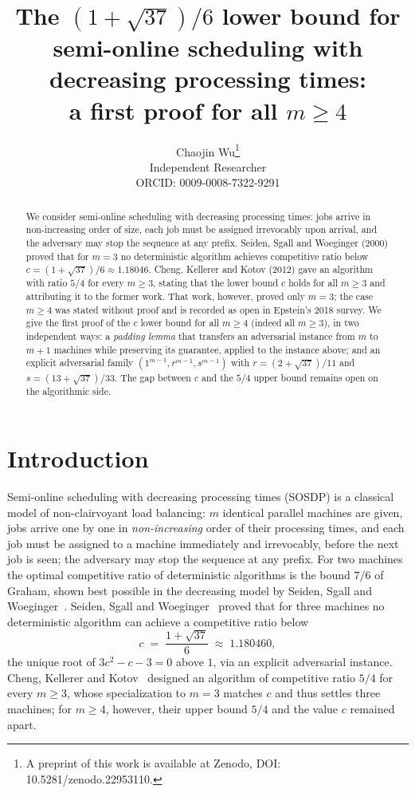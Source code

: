 \documentclass[11pt]{article}
\title{The $(1+\sqrt{37})/6$ lower bound for semi-online scheduling with
decreasing processing times:\\ a first proof for all $m\ge 4$}
\author{Chaojin Wu\thanks{A preprint of this work is available at Zenodo, DOI: 10.5281/zenodo.22953110.}\\
Independent Researcher\\
ORCID: 0009-0008-7322-9291}
\date{}
\theoremstyle{definition}
\begin{document}
\maketitle

\begin{abstract}
We consider semi-online scheduling with decreasing processing times: jobs
arrive in non-increasing order of size, each job must be assigned irrevocably
upon arrival, and the adversary may stop the sequence at any prefix. Seiden,
Sgall and Woeginger (2000) proved that for $m=3$ no deterministic algorithm
achieves competitive ratio below $c=(1+\sqrt{37})/6\approx 1.18046$. Cheng,
Kellerer and Kotov (2012) gave an algorithm with ratio $5/4$ for every
$m\ge 3$, stating that the lower bound $c$ holds for all $m\ge 3$ and
attributing it to the former work. That work, however, proved only $m=3$;
the case $m\ge 4$ was stated without proof and is recorded as open in
Epstein's 2018 survey.
We give the first proof of the $c$ lower bound for all $m\ge 4$ (indeed all
$m\ge 3$), in two independent ways: a \emph{padding lemma} that transfers an
adversarial instance from $m$ to $m+1$ machines while preserving its
guarantee, applied to the instance above; and an explicit adversarial family
$(1^{m-1},r^{m-1},s^{m-1})$ with $r=(2+\sqrt{37})/11$ and
$s=(13+\sqrt{37})/33$. The gap between $c$ and the $5/4$ upper bound remains
open on the algorithmic side.
\end{abstract}

\section{Introduction}

Semi-online scheduling with decreasing processing times (SOSDP) is a
classical model of non-clairvoyant load balancing: $m$ identical parallel
machines are given, jobs arrive one by one in \emph{non-increasing} order of
their processing times, and each job must be assigned to a machine
immediately and irrevocably, before the next job is seen; the adversary may
stop the sequence at any prefix. For two machines the optimal competitive
ratio of deterministic algorithms is the bound $7/6$ of Graham, shown best
possible in the decreasing model by Seiden, Sgall and
Woeginger~\cite{SSW00}. Seiden, Sgall and Woeginger~\cite{SSW00} proved
that for three machines no deterministic algorithm can achieve a competitive
ratio below
\[
c \;=\; \frac{1+\sqrt{37}}{6}\;\approx\;1.180460,
\]
the unique root of $3c^{2}-c-3=0$ above $1$, via an explicit adversarial
instance. Cheng, Kellerer and Kotov~\cite{CKK12} designed an algorithm of
competitive ratio $5/4$ for every $m\ge 3$, whose specialization to $m=3$
matches $c$ and thus settles three machines; for $m\ge 4$, however, their
upper bound $5/4$ and the value $c$ remained apart.
\end{document}
